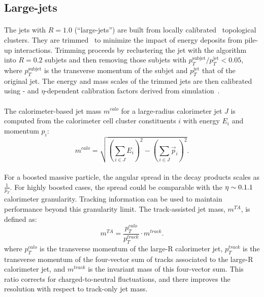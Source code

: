 \subsection{Large-\R jets}
\paragraph{}
The jets with $R=1.0$ (``large-\R jets'') are built from locally calibrated~\cite{Aad:2011he} topological clusters. They are trimmed~\cite{Krohn2010} to minimize the impact of energy deposits from pile-up interactions. 
Trimming proceeds by reclustering the jet with the \kt algorithm~\cite{Ellis:1993tq} into $R = 0.2$ subjets and then removing those subjets with $p_T^{\mathrm{subjet}}/p_T^{\mathrm{jet}} < 0.05$, where $p_T^{\mathrm{subjet}}$ is the transverse momentum of the subjet and $p_T^{\mathrm{jet}}$ that of the original jet. 
The energy and mass scales of the trimmed jets are then calibrated using \pt- and $\eta$-dependent calibration factors derived from simulation~\cite{PERF-2012-02}.


\paragraph{}
The calorimeter-based jet mass $m^{calo}$ for  a large-radius calorimeter jet $J$ is computed from the calorimeter cell cluster constituents $i$ with energy $E_i$ and momentum $p_i$:
\begin{equation}
m^{calo} = \sqrt{\left(\sum_{i\in J}E_i\right)^2-\left(\sum_{i\in J}\vec{p}_i\right)^2}.
\end{equation}

\paragraph{}
For a boosted massive particle, the angular spread in the decay products scales as $\frac{1}{p_T}$. 
For highly boosted cases, the spread could be comparable with the $\eta\time\phi \sim 0.1\time0.1$ calorimeter granularity. 
Tracking information can be used to maintain performance beyond this granularity limit.
The track-assisted jet mass, $m^{TA}$, is defined as:
\begin{equation}
m^{TA} = \frac{p_T^{calo}}{p_T^{track}} \cdot m^{track}.
\end{equation}
where $p_{T}^{calo}$ is the transverse momentum of the large-R calorimeter jet, $p_{T}^{track}$ is the transverse momentum of the four-vector sum of tracks associated to the large-R calorimeter jet, and $m^{track}$ is the invariant mass of this four-vector sum. This ratio corrects for charged-to-neutral fluctuations, and there improves the resolution with respect to track-only jet mass.

